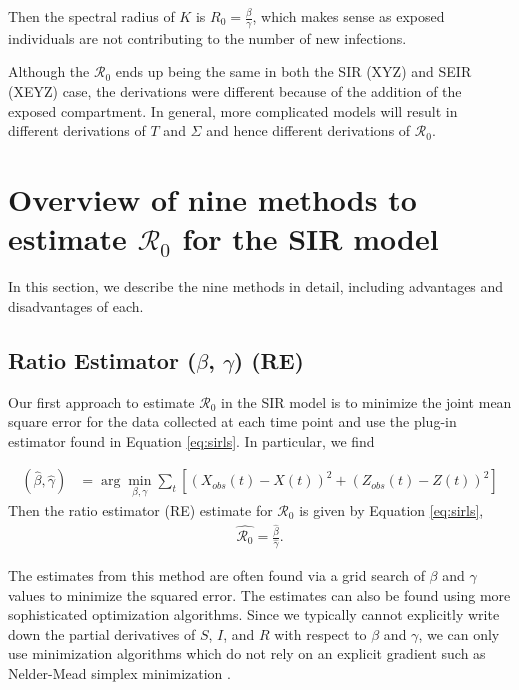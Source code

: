 \documentclass[12pt]{article}
\newcommand{\wxxsir}{nine } %
\newcommand{\rr}{\ensuremath{\mathcal{R}_0}}
\begin{document}
  Then the spectral radius of $K$ is $R_0  = \frac{\beta}{\gamma}$, which makes sense as exposed individuals are not contributing to the number of new infections.

  Although the $\rr$ ends up being the same in both the SIR (XYZ) and SEIR (XEYZ) case, the derivations were different because of the addition of the exposed compartment.  In general, more complicated models will result in different derivations of $T$ and $\Sigma$ and hence different derivations of $\rr$.




\section{Overview of \wxxsir methods to estimate $\rr$ for the SIR model}
\label{sec:methods} 

In this section, we describe the \wxxsir methods in detail, including advantages and disadvantages of each.

\subsection{Ratio Estimator ($\beta$, $\gamma$) (RE)}\label{least-squares-beta-gamma}
Our first approach to estimate $\rr$ in the SIR model is to minimize the joint mean square error for the data collected at each time point and use the plug-in estimator found in Equation \ref{eq:sirls}.  In particular, we find

\begin{align*}
(\hat{\beta}, \hat{\gamma} )&=\arg \min_{\beta, \gamma} \sum_{t} \left [ \left (X_{obs}(t) - X(t)\right )^2 + \left ( Z_{obs}(t) - Z(t) \right )^2 \right ]
\end{align*}
Then the ratio estimator (RE) estimate for $\rr$ is given by Equation \ref{eq:sirls},
\begin{align}\label{eq:sirls}
  \hat{\rr}= \frac{\hat{\beta}}{\hat{\gamma}}.
\end{align}

The estimates from this method are often found via a grid search of $\beta$ and $\gamma$ values to minimize the squared error.  The estimates can also be found using more sophisticated optimization algorithms. Since we typically cannot explicitly write down the partial derivatives of $S$, $I$, and $R$ with respect to $\beta$ and $\gamma$, we can only use minimization algorithms which do not rely on an explicit gradient such as Nelder-Mead simplex minimization \citep{nelder-mead1965}.
\end{document}
